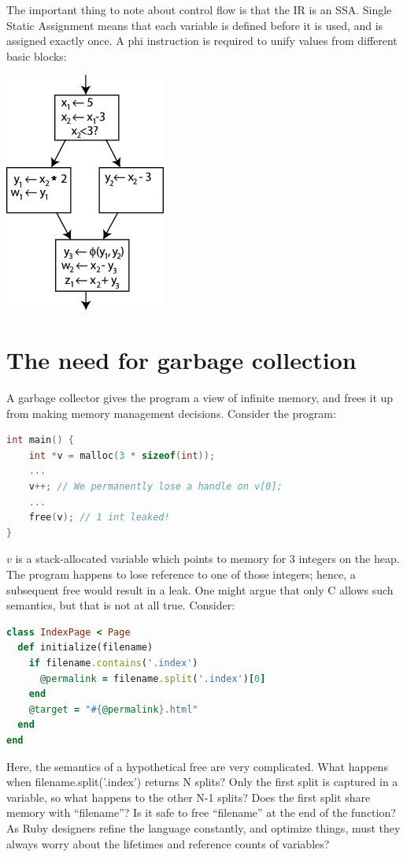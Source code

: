 \documentclass{article}
\begin{document}
The important thing to note about control flow is that the IR is an
SSA. Single Static Assignment means that each variable is defined
before it is used, and is assigned exactly once. A phi instruction is
required to unify values from different basic blocks:
\begin{center}\includegraphics[scale=0.8]{ssa}\end{center}

\section{The need for garbage collection}
A garbage collector gives the program a view of infinite memory, and
frees it up from making memory management decisions. Consider the
program:
\begin{lstlisting}[language=c]
int main() {
	int *v = malloc(3 * sizeof(int));
	...
	v++; // We permanently lose a handle on v[0];
	...
	free(v); // 1 int leaked!
}
\end{lstlisting}
$v$ is a stack-allocated variable which points to memory for 3
integers on the heap. The program happens to lose reference to one of
those integers; hence, a subsequent free would result in a leak. One
might argue that only C allows such semantics, but that is not at all
true. Consider:
\begin{lstlisting}[language=ruby]
class IndexPage < Page
  def initialize(filename)
    if filename.contains('.index')
      @permalink = filename.split('.index')[0]
    end
    @target = "#{@permalink}.html"
  end
end
\end{lstlisting}
Here, the semantics of a hypothetical free are very complicated. What
happens when filename.split('.index') returns N splits? Only the first
split is captured in a variable, so what happens to the other N-1
splits? Does the first split share memory with ``filename''? Is it
safe to free ``filename'' at the end of the function? As Ruby
designers refine the language constantly, and optimize things, must
they always worry about the lifetimes and reference counts of
variables?\\
\end{document}
